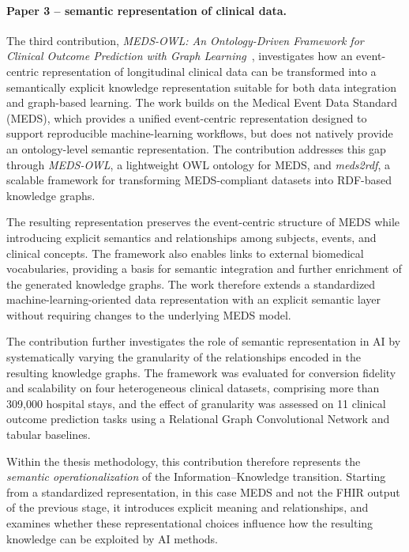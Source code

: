 \paragraph{Paper 3 -- semantic representation of clinical data.}

The third contribution, \emph{MEDS-OWL: An Ontology-Driven Framework for Clinical Outcome Prediction with Graph Learning}~\cite{marfoglia_meds-owl_2026}, investigates how an event-centric representation of longitudinal clinical data can be transformed into a semantically explicit knowledge representation suitable for both data integration and graph-based learning. The work builds on the Medical Event Data Standard (MEDS), which provides a unified event-centric representation designed to support reproducible machine-learning workflows, but does not natively provide an ontology-level semantic representation. The contribution addresses this gap through \emph{MEDS-OWL}, a lightweight OWL ontology for MEDS, and \emph{meds2rdf}, a scalable framework for transforming MEDS-compliant datasets into RDF-based knowledge graphs.

The resulting representation preserves the event-centric structure of MEDS while introducing explicit semantics and relationships among subjects, events, and clinical concepts. The framework also enables links to external biomedical vocabularies, providing a basis for semantic integration and further enrichment of the generated knowledge graphs. The work therefore extends a standardized machine-learning-oriented data representation with an explicit semantic layer without requiring changes to the underlying MEDS model.

The contribution further investigates the role of semantic representation in AI by systematically varying the granularity of the relationships encoded in the resulting knowledge graphs. The framework was evaluated for conversion fidelity and scalability on four heterogeneous clinical datasets, comprising more than 309,000 hospital stays, and the effect of granularity was assessed on 11 clinical outcome prediction tasks using a Relational Graph Convolutional Network and tabular baselines.

Within the thesis methodology, this contribution therefore represents the \emph{semantic operationalization} of the Information--Knowledge transition. Starting from a standardized representation, in this case MEDS and not the FHIR output of the previous stage, it introduces explicit meaning and relationships, and examines whether these representational choices influence how the resulting knowledge can be exploited by AI methods.

